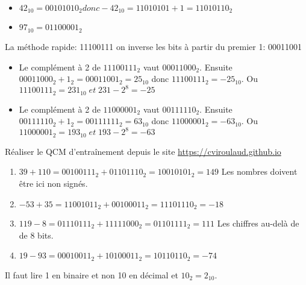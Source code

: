 \documentclass[a4paper,11pt]{article}
\begin{document}
\begin{Form}
\begin{exo}
\begin{itemize}
\item $42_{10}=00101010_2 donc -42_{10}=11010101+1=11010110_2$
\item $97_{10}=01100001_2$
\end{itemize}
\end{exo}
\begin{exo}
\begin{commentprof}
La méthode rapide: 11100111 \rightarrow on inverse les bits à partir du premier 1: 00011001 
\end{commentprof}
\begin{itemize}
\item Le complément à 2 de $11100111_2$ vaut $00011000_2$. Ensuite $00011000_2+1_2=00011001_2=25_{10}$ donc $11100111_2=-25_{10}$. Ou $11100111_2=231_{10}\;et\;231-2^8=-25$
\item Le complément à 2 de $11000001_2$ vaut $00111110_2$. Ensuite $00111110_2+1_2=00111111_2=63_{10}$ donc $11000001_2=-63_{10}$. Ou $11000001_2=193_{10}\;et\;193-2^8=-63$
\end{itemize}
\end{exo}
\begin{exo}
Réaliser le QCM d’entraînement depuis le site \url{https://cviroulaud.github.io} 
\end{exo}
\begin{exo}
\begin{enumerate}
\item $39+110=00100111_2+01101110_2=10010101_2=149$ Les nombres doivent être ici non signés.
\item $-53+35=11001011_2+00100011_2=11101110_2=-18$
\item $119-8=01110111_2+11111000_2=01101111_2=111$ Les chiffres au-delà de de 8 bits.
\item $19-93=00010011_2+10100011_2=10110110_2=-74$
\end{enumerate}
\end{exo}
\begin{exo}
Il faut lire 1 en binaire et non 10 en décimal et $10_2=2_{10}$.
\end{exo}
\end{Form}
\end{document}
